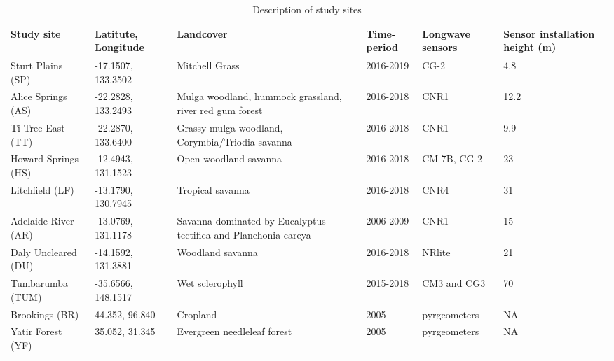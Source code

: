 \documentclass[fleqn,10pt]{wlscirep}
\begin{document}
{{\begin{table}[h!]
\centering
\caption{Description of study sites}
\begin{tabular}{|p{2.5cm}|p{1.5cm}|p{2.2cm}|p{1.5cm}|p{2cm}|p{1cm}|}
 \hline
 \textbf{Study site} &\textbf{Latitute, Longitude} & \textbf{Landcover} & \textbf{Time-period} 
 & \textbf{Longwave sensors} & \textbf{Sensor installation height (m)} \\
 \hline 
 Sturt Plains (SP) &  -17.1507, 133.3502 & Mitchell Grass & 2016-2019 & CG-2 & 4.8\\ 
 \hline
 Alice Springs (AS) &  -22.2828, 133.2493 &  Mulga woodland, hummock grassland, river red gum forest & 2016-2018 & CNR1 & 12.2\\ 
 \hline 
 Ti Tree East (TT) &  -22.2870, 133.6400 & Grassy mulga woodland, Corymbia/Triodia savanna & 2016-2018 & CNR1 & 9.9 \\
 \hline
 Howard Springs (HS) &  -12.4943, 131.1523 & Open woodland savanna & 2016-2018 & CM-7B, CG-2 & 23\\
 \hline
 Litchfield (LF) &  -13.1790, 130.7945 & Tropical savanna & 2016-2018 & CNR4 & 31 \\
 \hline
 Adelaide River (AR) & -13.0769, 131.1178 & Savanna dominated by Eucalyptus tectifica and Planchonia careya & 2006-2009 & CNR1 & 15\\
 \hline
Daly Uncleared (DU) & -14.1592, 131.3881 & Woodland savanna & 2016-2018 & NRlite & 21 \\
 \hline
 Tumbarumba (TUM) & -35.6566, 148.1517 & Wet sclerophyll & 2015-2018 &CM3 and CG3 & 70 \\
 \hline
Brookings (BR) & 44.352, 96.840 & Cropland & 2005 & pyrgeometers\cite{guillevic2017land}& NA
 \\
 \hline 
 Yatir Forest (YF) & 35.052, 31.345 & Evergreen needleleaf forest & 2005 & pyrgeometers\cite{guillevic2017land}
 & NA\\
 \hline 
\end{tabular}
\label{table:studysites}
\end{table}


}}
\end{document}
